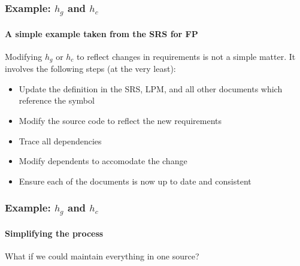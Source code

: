 \documentclass{beamer}
\begin{document}

%
%
%
%
%
%


%
%
%


\begin{frame}

\frametitle{Example: $h_g$ and $h_c$}

\framesubtitle{A simple example taken from the SRS for FP}

Modifying $h_g$ or $h_c$ to reflect changes in requirements is not a simple matter. It involves the following steps (at the very least):
\begin{itemize}
\item Update the definition in the SRS, LPM, and all other documents which reference the symbol
\item Modify the source code to reflect the new requirements
\item Trace all dependencies
\item Modify dependents to accomodate the change
\item Ensure each of the documents is now up to date and consistent
\end{itemize}

\end{frame}


\begin{frame}

\frametitle{Example: $h_g$ and $h_c$}

\framesubtitle{Simplifying the process}

What if we could maintain everything in one source?

\end{frame}
\end{document}
